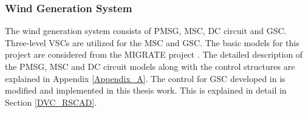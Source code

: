 \subsubsection{Wind Generation System}
The wind generation system consists of \gls{PMSG}, \gls{MSC}, \gls{DC} circuit and \gls{GSC}. Three-level \gls{VSC}s are utilized for the \gls{MSC} and \gls{GSC}. The basic models for this project are considered from the MIGRATE project \cite{denis_migrate_2018}. The detailed description of the \gls{PMSG}, \gls{MSC} and \gls{DC} circuit models along with the control structures are explained in Appendix \ref{Appendix_A}. The control for \gls{GSC} developed in \cite{sethi_real-time_nodate-new} is modified and implemented in this thesis work. This is explained in detail in Section \ref{DVC_RSCAD}.

\begin{figure}[H]
\hspace{10mm}
\centering

\end{figure}
